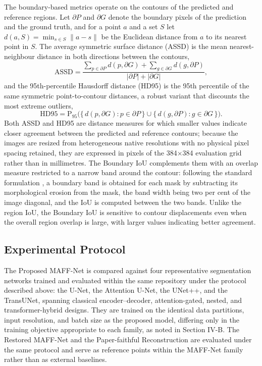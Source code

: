 The boundary-based metrics operate on the contours of the predicted and reference regions. Let $\partial P$ and $\partial G$ denote the boundary pixels of the prediction and the ground truth, and for a point $a$ and a set $S$ let $d(a,S)=\min_{s\in S}\lVert a-s\rVert$ be the Euclidean distance from $a$ to its nearest point in $S$. The average symmetric surface distance (ASSD) is the mean nearest-neighbour distance in both directions between the contours,
\begin{equation}
\mathrm{ASSD} = \frac{\sum_{p\in\partial P} d(p,\partial G) + \sum_{g\in\partial G} d(g,\partial P)}{\lvert\partial P\rvert + \lvert\partial G\rvert}, \tag{12}
\label{eq:12}
\end{equation}
and the 95th-percentile Hausdorff distance (HD95) is the 95th percentile of the same symmetric point-to-contour distances, a robust variant that discounts the most extreme outliers,
\begin{equation}
\mathrm{HD95} = \mathrm{P}_{95}\big(\{\, d(p,\partial G) : p\in\partial P\,\} \cup \{\, d(g,\partial P) : g\in\partial G\,\}\big). \tag{13}
\label{eq:13}
\end{equation}
Both ASSD and HD95 are distance measures for which smaller values indicate closer agreement between the predicted and reference contours; because the images are resized from heterogeneous native resolutions with no physical pixel spacing retained, they are expressed in pixels of the 384$\times$384 evaluation grid rather than in millimetres. The Boundary IoU complements them with an overlap measure restricted to a narrow band around the contour: following the standard formulation \cite{ref12}, a boundary band is obtained for each mask by subtracting its morphological erosion from the mask, the band width being two per cent of the image diagonal, and the IoU is computed between the two bands. Unlike the region IoU, the Boundary IoU is sensitive to contour displacements even when the overall region overlap is large, with larger values indicating better agreement.

\subsection{Experimental Protocol}

The Proposed MAFF-Net is compared against four representative segmentation networks trained and evaluated within the same repository under the protocol described above: the U-Net, the Attention U-Net, the UNet++, and the TransUNet, spanning classical encoder--decoder, attention-gated, nested, and transformer-hybrid designs. They are trained on the identical data partitions, input resolution, and batch size as the proposed model, differing only in the training objective appropriate to each family, as noted in Section IV-B. The Restored MAFF-Net and the Paper-faithful Reconstruction are evaluated under the same protocol and serve as reference points within the MAFF-Net family rather than as external baselines.

